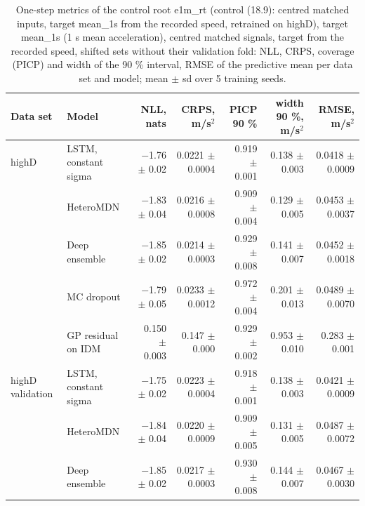 \begin{table}[htbp]
\centering
\footnotesize
\caption{One-step metrics of the control root e1m\_rt (control (18.9): centred matched inputs, target mean\_1s from the recorded speed, retrained on highD), target mean\_1s (1 s mean acceleration), centred matched signals, target from the recorded speed, shifted sets without their validation fold: NLL, CRPS, coverage (PICP) and width of the 90 \% interval, RMSE of the predictive mean per data set and model; mean $\pm$ sd over 5 training seeds.}
\label{tab:t1-one-step--matched-rt--mean-1s}
\begin{tabular}{llrrrrr}
\toprule
Data set & Model & NLL, nats & CRPS, m/s$^2$ & PICP 90 \% & width 90 \%, m/s$^2$ & RMSE, m/s$^2$ \\
\midrule
highD & LSTM, constant sigma & $-$1.76 $\pm$ 0.02 & 0.0221 $\pm$ 0.0004 & 0.919 $\pm$ 0.001 & 0.138 $\pm$ 0.003 & 0.0418 $\pm$ 0.0009 \\
 & HeteroMDN & $-$1.83 $\pm$ 0.04 & 0.0216 $\pm$ 0.0008 & 0.909 $\pm$ 0.004 & 0.129 $\pm$ 0.005 & 0.0453 $\pm$ 0.0037 \\
 & Deep ensemble & $-$1.85 $\pm$ 0.02 & 0.0214 $\pm$ 0.0003 & 0.929 $\pm$ 0.008 & 0.141 $\pm$ 0.007 & 0.0452 $\pm$ 0.0018 \\
 & MC dropout & $-$1.79 $\pm$ 0.05 & 0.0233 $\pm$ 0.0012 & 0.972 $\pm$ 0.004 & 0.201 $\pm$ 0.013 & 0.0489 $\pm$ 0.0070 \\
 & GP residual on IDM & 0.150 $\pm$ 0.003 & 0.147 $\pm$ 0.000 & 0.929 $\pm$ 0.002 & 0.953 $\pm$ 0.010 & 0.283 $\pm$ 0.001 \\
\midrule
highD validation & LSTM, constant sigma & $-$1.75 $\pm$ 0.02 & 0.0223 $\pm$ 0.0004 & 0.918 $\pm$ 0.001 & 0.138 $\pm$ 0.003 & 0.0421 $\pm$ 0.0009 \\
 & HeteroMDN & $-$1.84 $\pm$ 0.04 & 0.0220 $\pm$ 0.0009 & 0.909 $\pm$ 0.005 & 0.131 $\pm$ 0.005 & 0.0487 $\pm$ 0.0072 \\
 & Deep ensemble & $-$1.85 $\pm$ 0.02 & 0.0217 $\pm$ 0.0003 & 0.930 $\pm$ 0.008 & 0.144 $\pm$ 0.007 & 0.0467 $\pm$ 0.0030 \\

\end{tabular}
\end{table}

